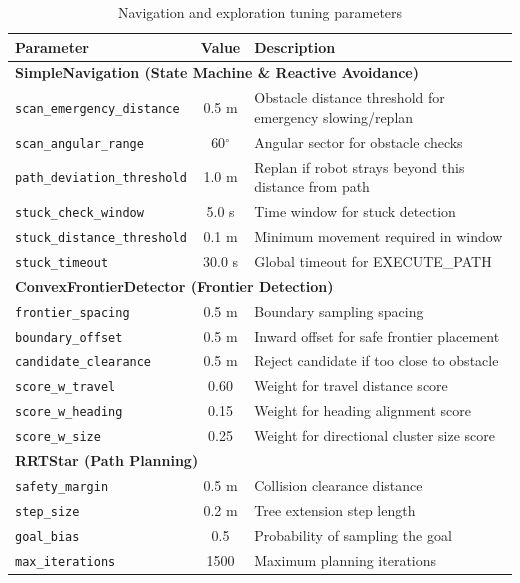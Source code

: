 \documentclass[11pt]{article}
\begin{document}
\begin{table}[htbp]
	\centering
	\caption{Navigation and exploration tuning parameters}
	\label{tab:navigation_params}
	\begin{tabular}{l c p{7.5cm}}
		\toprule
		\textbf{Parameter} & \textbf{Value} & \textbf{Description} \\
		\midrule
		\multicolumn{3}{l}{\textbf{SimpleNavigation (State Machine \& Reactive Avoidance)}} \\
		\texttt{scan\_emergency\_distance} & 0.5 m & Obstacle distance threshold for emergency slowing/replan \\
		\texttt{scan\_angular\_range} & 60$^\circ$ & Angular sector for obstacle checks \\
		\texttt{path\_deviation\_threshold} & 1.0 m & Replan if robot strays beyond this distance from path \\
		\texttt{stuck\_check\_window} & 5.0 s & Time window for stuck detection \\
		\texttt{stuck\_distance\_threshold} & 0.1 m & Minimum movement required in window \\
		\texttt{stuck\_timeout} & 30.0 s & Global timeout for EXECUTE\_PATH \\
		\midrule
		\multicolumn{3}{l}{\textbf{ConvexFrontierDetector (Frontier Detection)}} \\
		\texttt{frontier\_spacing} & 0.5 m & Boundary sampling spacing \\
		\texttt{boundary\_offset} & 0.5 m & Inward offset for safe frontier placement \\
		\texttt{candidate\_clearance} & 0.5 m & Reject candidate if too close to obstacle \\
		\texttt{score\_w\_travel} & 0.60 & Weight for travel distance score \\
		\texttt{score\_w\_heading} & 0.15 & Weight for heading alignment score \\
		\texttt{score\_w\_size} & 0.25 & Weight for directional cluster size score \\
		\midrule
		\multicolumn{3}{l}{\textbf{RRTStar (Path Planning)}} \\
		\texttt{safety\_margin} & 0.5 m & Collision clearance distance \\
		\texttt{step\_size} & 0.2 m & Tree extension step length \\
		\texttt{goal\_bias} & 0.5 & Probability of sampling the goal \\
		\texttt{max\_iterations} & 1500 & Maximum planning iterations \\

\end{tabular}
\end{table}
\end{document}
